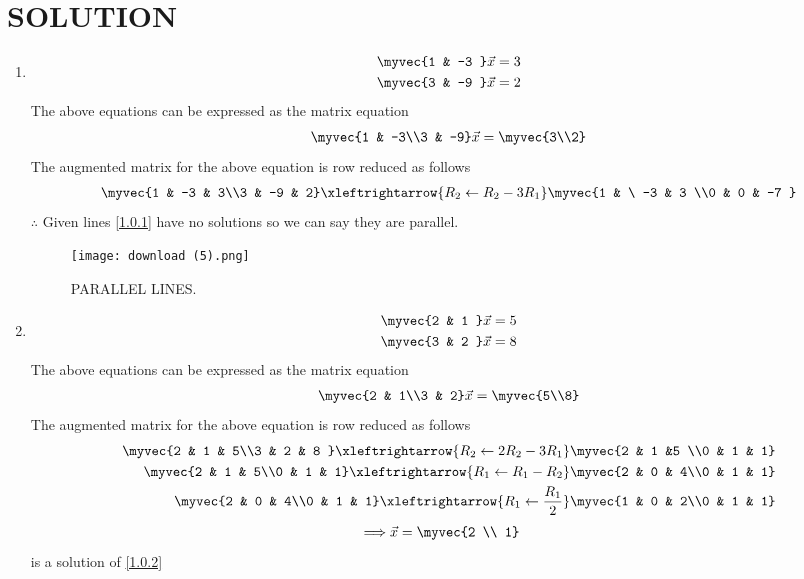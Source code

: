 \documentclass[journal,12pt,twocolumn]{IEEEtran}
\begin{document}
\section{SOLUTION}  
\begin{enumerate}
\item
\begin{align}
\begin{split}
\myvec{1 & -3 }\vec{x}&=3
\\
\myvec{3 & -9 }\vec{x}&=2
\end{split}
\end{align}
The above equations can be expressed as the matrix equation
\begin{align}
\myvec{1 & -3\\3 & -9} \vec{x} = \myvec{3\\2}
\end{align}
%
The augmented matrix for the above equation is row reduced as follows
\begin{align}
\myvec{1 & -3 & 3\\3 & -9 & 2} 
\xleftrightarrow {R_2\leftarrow R_2 -3R_1}\myvec{1 & \ -3 & 3 \\0 & 0 & -7 }
\end{align}
%
$\therefore$ Given lines \eqref{1.0.1} have no solutions so we can say they are parallel.
\begin{figure}[ht!]
\centering
\texttt{[image: download (5).png]}
\caption{PARALLEL LINES.}
\label{figure: parallel lines.}
\end{figure}
\item
\begin{align}
\begin{split}
\myvec{2 & 1 }\vec{x}&=5  
\\
\myvec{3 & 2 }\vec{x}&=8
\end{split}
\end{align}
The above equations can be expressed as the matrix equation
\begin{align}
\myvec{2 & 1\\3 & 2}
\vec{x} = \myvec{5\\8}
\end{align}
%
The augmented matrix for the above equation is row reduced as follows
\begin{align}
\myvec{2 & 1 & 5\\3 & 2 & 8 }
\xleftrightarrow {R_2\leftarrow 2R_2-3R_1}\myvec{2 & 1 &5 \\0 & 1 & 1}
\\
\myvec{2 & 1 & 5\\0 & 1 & 1}
\xleftrightarrow {R_1\leftarrow
R_1-R_2}\myvec{2 & 0 & 4\\0 & 1 & 1}
\\
\myvec{2 & 0 & 4\\0 & 1 & 1}
\xleftrightarrow{R_1\leftarrow \frac{R_1}{2}}\myvec{1 & 0 & 2\\0 & 1 & 1}
\end{align}
\begin{align}
\Longrightarrow \vec{x}&= \myvec{2 \\ 1}
\end{align} is a solution of \eqref{1.0.2} 



\end{enumerate}
\end{document}
